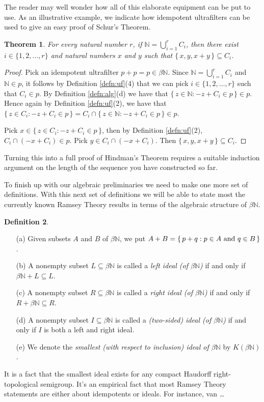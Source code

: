 \documentclass[12pt]{article}
\theoremstyle{plain}
\newtheorem{thm}{Theorem}[section]
\theoremstyle{definition}
\newtheorem{defn}[thm]{Definition}
\newcommand{\bbN}{\mathbb{N}}
\begin{document}
The reader may well wonder how all of this elaborate equipment can be
put to use. 
As an illustrative example, we indicate how idempotent ultrafilters
can be used to give an easy proof of Schur's Theorem. 

  \begin{thm}
    For every natural number $r$, if  \/ $\bbN = \bigcup_{i=1}^r C_i$,
    then there exist $i \in \{1, 2, \ldots, r\}$ and natural numbers
    $x$ and $y$ such that $\{\, x, y, x+y \,\} \subseteq C_i$.
  \end{thm}
  \begin{proof}
    Pick an idempotent ultrafilter $p + p = p \in \beta\bbN$. 
    Since $\bbN = \bigcup_{i=1}^r C_i$ and $\bbN \in p$, it follows by
    Definition \ref{defn:uf}(4) that we can pick $i \in \{1, 2, \ldots,
    r\}$ such that $C_i \in p$. 
    By Definition \ref{defn:alg}(d) we have that $\{\, z \in \bbN : -z
    + C_i \in p \,\} \in p$.
    Hence again by Definition \ref{defn:uf}(2), we have that $\{\, z \in
    C_i : -z + C_i \in p \,\} = C_i \cap
    \{\, z \in \bbN : -z + C_i \in p \,\} \in p$.

    Pick $x \in \{\,z \in C_i: -z + C_i \in p \,\}$, then by
    Definition \ref{defn:uf}(2), $C_i \cap (-x+C_i) \in p$.
    Pick $y \in C_i \cap (-x+C_i)$.
    Then $\{\, x, y, x+y\,\} \subseteq C_i$.
  \end{proof}
Turning this into a full proof of Hindman's Theorem requires a
suitable induction argument on the length of the sequence you have
constructed so far. 

To finish up with our algebraic preliminaries we need to make one more
set of definitions.
With this next set of definitions we will be able to state most
the currently known Ramsey Theory results in terms of
the algebraic structure of $\beta\bbN$.
  \begin{defn}
    \begin{itemize}
      \item[(a)] Given subsets $A$ and $B$ of $\beta\bbN$, we put $A +
        B = \{\, p+q : \hbox{$p \in A$ and $q \in B$} \,\}$.
      \item[(b)] A nonempty subset $L \subseteq \beta\bbN$ is called a
        \textsl{left ideal (of $\beta\bbN$)} if and only if $\beta\bbN
        + L \subseteq L$.
      \item[(c)] A nonempty subset $R \subseteq \beta\bbN$ is called a
        \textsl{right ideal (of $\beta\bbN$)} if and only if $R +
        \beta\bbN \subseteq R$.
      \item[(d)] A nonempty subset $I \subseteq \beta\bbN$ is called a
        \textsl{(two-sided) ideal (of $\beta\bbN$)} if and only if $I$
        is both a left and right ideal.
      \item[(e)] We denote the \textsl{smallest (with respect to
          inclusion) ideal of $\beta\bbN$} by $K(\beta\bbN)$.
    \end{itemize}
  \end{defn}
It is a fact\cite[Theorem 2.8]{Hindman:1998fk} that the smallest ideal
exists for any compact Haudorff right-topological semigroup. 
It's an empirical fact that most Ramsey Theory statements are either
about idempotents or ideals.
For instance, van \dots




\end{document}
